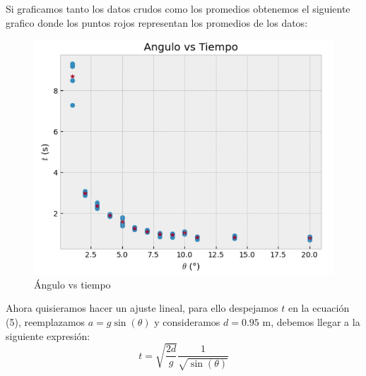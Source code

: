 \documentclass{article}
\begin{document}
Si graficamos tanto los datos crudos como los promedios obtenemos el 
siguiente grafico donde los puntos rojos representan los promedios de 
los datos:
\begin{figure}[H]
\centering
\includegraphics[scale=0.55]{img/grafico1.png}
\caption{Ángulo vs tiempo}
\label{fig:angulo-tiempo}
\end{figure}

Ahora quisieramos hacer un ajuste lineal, para ello despejamos $t$ en la 
ecuación (5), reemplazamos $a = g \sin(\theta)$ y consideramos $d = 0.95$ 
m, debemos llegar a la siguiente expresión:
\begin{equation}
   t = \sqrt{\dfrac{2d}{g}} \dfrac{1}{\sqrt{\sin(\theta)}}
\end{equation}
\end{document}
